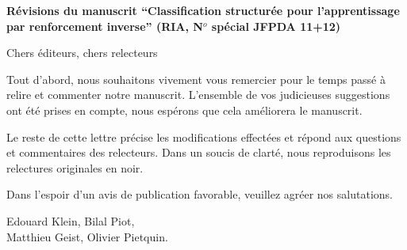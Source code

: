 \documentclass[11pt, a4paper]{letter}
\begin{document}

\color{blue}

\address{Edouard Klein,  Bilal Piot,\\Matthieu Geist, Olivier Pietquin \\ IMS – Groupe de recherche MaLIS, Sup\'elec \\ 2 rue Edouard Belin, 57070 Metz (France)}
\date{Metz, \today. \vspace{1.5cm}}



\begin{letter}{\large \textbf{Révisions du manuscrit ``Classification structurée pour l'apprentissage par renforcement inverse'' (RIA, N$^o$ spécial JFPDA 11+12)}}
\bigskip
\opening{Chers éditeurs, chers relecteurs}

\bigskip

Tout d'abord, nous souhaitons vivement vous remercier pour le temps passé à relire et commenter notre manuscrit. L'ensemble de vos judicieuses suggestions ont été prises en compte, nous espérons que cela améliorera le manuscrit.

Le reste de cette lettre précise les modifications effectées et répond aux questions et commentaires des relecteurs. Dans un soucis de clarté, nous reproduisons les relectures originales en noir.

Dans l'espoir d'un avis de publication favorable, veuillez agréer nos salutations.

\begin{flushright}
Edouard Klein, Bilal Piot, \\ Matthieu Geist, Olivier Pietquin.
\end{flushright}


\end{letter}
\end{document}
